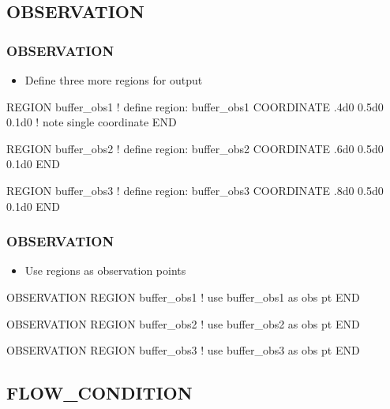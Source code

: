 \documentclass{beamer}
\newcommand\redcomment[1]{{{\color{red} #1}}}
\newcommand\bluecomment[1]{{{\color{blue} #1}}}
\newcommand\greencomment[1]{{{\color{green} #1}}}
\begin{document}
\subsection{OBSERVATION}

\begin{frame}[fragile]\frametitle{OBSERVATION}
\begin{itemize}
  \item{Define three more regions for \redcomment{output}}
\end{itemize}

\begin{semiverbatim}\small
REGION buffer_obs1 \bluecomment{! define region:} \greencomment{buffer_obs1}
  COORDINATE .4d0 0.5d0 0.1d0 \bluecomment{! note single coordinate}
END

REGION buffer_obs2 \bluecomment{! define region:} \greencomment{buffer_obs2}
  COORDINATE .6d0 0.5d0 0.1d0
END

REGION buffer_obs3 \bluecomment{! define region:} \greencomment{buffer_obs3}
  COORDINATE .8d0 0.5d0 0.1d0
END
\end{semiverbatim}
\end{frame}

\begin{frame}[fragile]\frametitle{OBSERVATION}
\begin{itemize}
  \item{Use regions as observation points}
\end{itemize}

\begin{semiverbatim}\small
OBSERVATION
  REGION buffer_obs1 \bluecomment{! use} \greencomment{buffer_obs1} \bluecomment{as obs pt}
END

OBSERVATION
  REGION buffer_obs2 \bluecomment{! use} \greencomment{buffer_obs2} \bluecomment{as obs pt}
END

OBSERVATION
  REGION buffer_obs3 \bluecomment{! use} \greencomment{buffer_obs3} \bluecomment{as obs pt}
END
\end{semiverbatim}
\end{frame}

\subsection{FLOW\_CONDITION}
\end{document}

